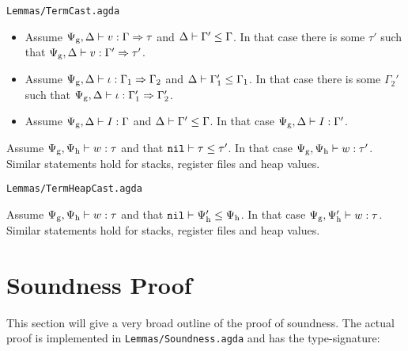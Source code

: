 \texttt{Lemmas/TermCast.agda}
\begin{lemma}
  \label{lemma:evaluatin-casting}
  \begin{itemize}
  \item Assume ${\Psi_{\mathrm{g}},\Delta} |- {v} : {\Gamma => \tau}$
    and ${\Delta} |- {\Gamma'} \le {\Gamma}$. In that case there is some
    $\tau'$ such that
    ${\Psi_{\mathrm{g}},\Delta} |- {v} : {\Gamma' => \tau'}$.

  \item Assume ${\Psi_{\mathrm{g}},\Delta} |- {\iota} : {\Gamma_1 => \Gamma_2}$
    and ${\Delta} |- {\Gamma_1'} \le {\Gamma_1}$. In that case there is some
    $\Gamma_2'$ such that
    ${\Psi_{\mathrm{g}},\Delta} |- {\iota} : {\Gamma_1' => \Gamma_2'}$.

  \item Assume ${\Psi_{\mathrm{g}},\Delta} |- {I} : {\Gamma}$ and
    ${\Delta} |- {\Gamma'} \le {\Gamma}$. In that case
    ${\Psi_{\mathrm{g}},\Delta} |- {I} : {\Gamma'}$.
  \end{itemize}
\end{lemma}

\begin{lemma}
  \label{lemma:value-casting}
  Assume ${\Psi_{\mathrm{g}},\Psi_{\mathrm{h}}} |- {w} : {\tau}$ and that
  ${\mathtt{nil}} |- {\tau} \le {\tau'}$. In that case
  ${\Psi_{\mathrm{g}},\Psi_{\mathrm{h}}} |- {w} : {\tau'}$. Similar
  statements hold for stacks, register files and heap values.
\end{lemma}

\texttt{Lemmas/TermHeapCast.agda}
\begin{lemma}
  \label{lemma:heap-casting}
  Assume ${\Psi_{\mathrm{g}},\Psi_{\mathrm{h}}} |- {w} : {\tau}$ and that
  ${\mathtt{nil}} |- {\Psi_{\mathrm{h}}'} \le {\Psi_{\mathrm{h}}}$. In that case
  ${\Psi_{\mathrm{g}},\Psi_{\mathrm{h}}'} |- {w} : {\tau}$. Similar
  statements hold for stacks, register files and heap values.
\end{lemma}

\section{Soundness Proof}

This section will give a very broad outline of the proof of soundness. The
actual proof is implemented in \texttt{Lemmas/Soundness.agda} and has the
type-signature:

